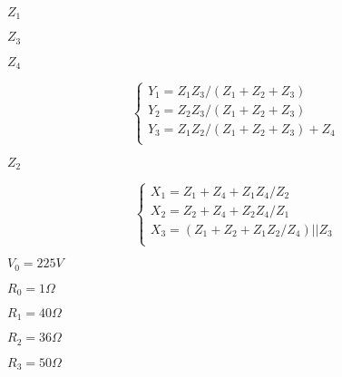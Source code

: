 {\newpage\clearpage
{}%
$Z_1$%
\lthtmlinlinemathZ
\lthtmlcheckvsize\clearpage}

{\newpage\clearpage
{}%
$Z_3$%
\lthtmlinlinemathZ
\lthtmlcheckvsize\clearpage}

{\newpage\clearpage
{}%
$Z_4$%
\lthtmlinlinemathZ
\lthtmlcheckvsize\clearpage}

{\newpage\clearpage
{}%
\begin{displaymath} \left\{ \begin{array}{l}
  Y_1=Z_1Z_3/(Z_1+Z_2+Z_3) \\
  Y_2=Z_2Z_3/(Z_1+Z_2+Z_3) \\
  Y_3=Z_1Z_2/(Z_1+Z_2+Z_3)+Z_4 \\
\end{array} \right. \end{displaymath}%
\lthtmldisplayZ
\lthtmlcheckvsize\clearpage}

{\newpage\clearpage
{}%
$Z_2$%
\lthtmlinlinemathZ
\lthtmlcheckvsize\clearpage}

{\newpage\clearpage
{}%
\begin{displaymath} \left\{ \begin{array}{l}
  X_1=Z_1+Z_4+Z_1Z_4/Z_2 \\
  X_2=Z_2+Z_4+Z_2Z_4/Z_1 \\
  X_3=(Z_1+Z_2+Z_1Z_2/Z_4) || Z_3 \\
\end{array} \right. \end{displaymath}%
\lthtmldisplayZ
\lthtmlcheckvsize\clearpage}

{\newpage\clearpage
{}%
$V_0=225 V$%
\lthtmlinlinemathZ
\lthtmlcheckvsize\clearpage}

{\newpage\clearpage
{}%
$R_0=1\Omega$%
\lthtmlinlinemathZ
\lthtmlcheckvsize\clearpage}

{\newpage\clearpage
{}%
$R_1=40\Omega$%
\lthtmlinlinemathZ
\lthtmlcheckvsize\clearpage}

{\newpage\clearpage
{}%
$R_2=36\Omega$%
\lthtmlinlinemathZ
\lthtmlcheckvsize\clearpage}

{\newpage\clearpage
{}%
$R_3=50\Omega$%
\lthtmlinlinemathZ
\lthtmlcheckvsize\clearpage}

